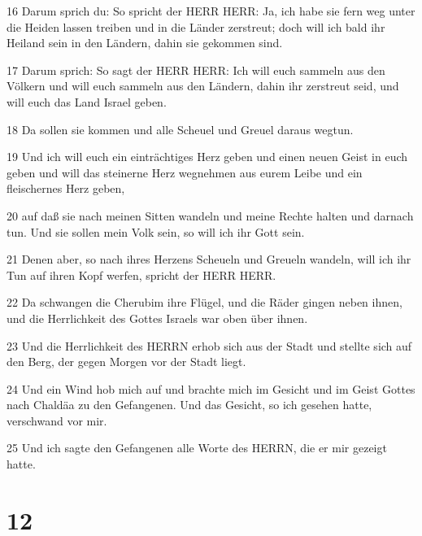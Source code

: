 \par 16 Darum sprich du: So spricht der HERR HERR: Ja, ich habe sie fern weg unter die Heiden lassen treiben und in die Länder zerstreut; doch will ich bald ihr Heiland sein in den Ländern, dahin sie gekommen sind.
\par 17 Darum sprich: So sagt der HERR HERR: Ich will euch sammeln aus den Völkern und will euch sammeln aus den Ländern, dahin ihr zerstreut seid, und will euch das Land Israel geben.
\par 18 Da sollen sie kommen und alle Scheuel und Greuel daraus wegtun.
\par 19 Und ich will euch ein einträchtiges Herz geben und einen neuen Geist in euch geben und will das steinerne Herz wegnehmen aus eurem Leibe und ein fleischernes Herz geben,
\par 20 auf daß sie nach meinen Sitten wandeln und meine Rechte halten und darnach tun. Und sie sollen mein Volk sein, so will ich ihr Gott sein.
\par 21 Denen aber, so nach ihres Herzens Scheueln und Greueln wandeln, will ich ihr Tun auf ihren Kopf werfen, spricht der HERR HERR.
\par 22 Da schwangen die Cherubim ihre Flügel, und die Räder gingen neben ihnen, und die Herrlichkeit des Gottes Israels war oben über ihnen.
\par 23 Und die Herrlichkeit des HERRN erhob sich aus der Stadt und stellte sich auf den Berg, der gegen Morgen vor der Stadt liegt.
\par 24 Und ein Wind hob mich auf und brachte mich im Gesicht und im Geist Gottes nach Chaldäa zu den Gefangenen. Und das Gesicht, so ich gesehen hatte, verschwand vor mir.
\par 25 Und ich sagte den Gefangenen alle Worte des HERRN, die er mir gezeigt hatte.

\chapter{12}

